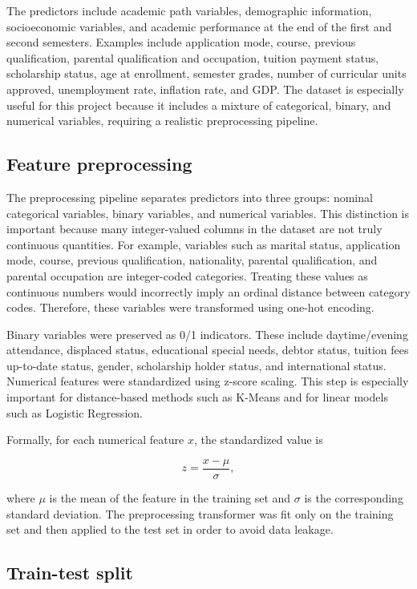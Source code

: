 \documentclass{article}
\begin{document}
The predictors include academic path variables, demographic information, socioeconomic variables, and academic performance at the end of the first and second semesters. Examples include application mode, course, previous qualification, parental qualification and occupation, tuition payment status, scholarship status, age at enrollment, semester grades, number of curricular units approved, unemployment rate, inflation rate, and GDP. The dataset is especially useful for this project because it includes a mixture of categorical, binary, and numerical variables, requiring a realistic preprocessing pipeline.

\subsection{Feature preprocessing}

The preprocessing pipeline separates predictors into three groups: nominal categorical variables, binary variables, and numerical variables. This distinction is important because many integer-valued columns in the dataset are not truly continuous quantities. For example, variables such as marital status, application mode, course, previous qualification, nationality, parental qualification, and parental occupation are integer-coded categories. Treating these values as continuous numbers would incorrectly imply an ordinal distance between category codes. Therefore, these variables were transformed using one-hot encoding.

Binary variables were preserved as 0/1 indicators. These include daytime/evening attendance, displaced status, educational special needs, debtor status, tuition fees up-to-date status, gender, scholarship holder status, and international status. Numerical features were standardized using z-score scaling. This step is especially important for distance-based methods such as K-Means and for linear models such as Logistic Regression.

Formally, for each numerical feature \(x\), the standardized value is

\[
z = \frac{x - \mu}{\sigma},
\]

where \(\mu\) is the mean of the feature in the training set and \(\sigma\) is the corresponding standard deviation. The preprocessing transformer was fit only on the training set and then applied to the test set in order to avoid data leakage.

\subsection{Train-test split}
\end{document}
